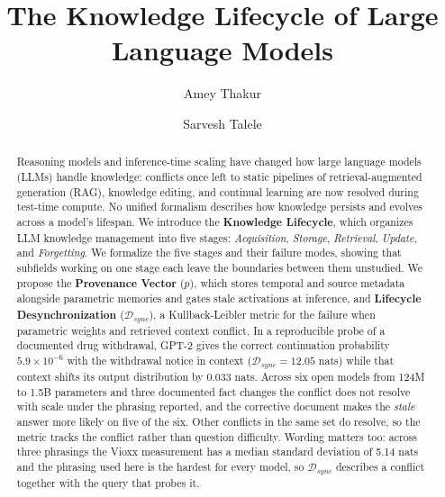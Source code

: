 \documentclass[manuscript, screen, review]{jair}
\title[The Knowledge Lifecycle of LLMs]{The Knowledge Lifecycle of Large Language Models}
\author{Amey Thakur}
\affiliation{%
  \institution{Independent Researcher}
  \city{Toronto}
  \state{Ontario}
  \country{Canada}
}
\author{Sarvesh Talele}
\affiliation{%
  \institution{Independent Researcher}
  \city{Mumbai}
  \state{Maharashtra}
  \country{India}
}
\begin{document}
\begin{abstract}
Reasoning models and inference-time scaling have changed how large language models (LLMs) handle knowledge: conflicts once left to static pipelines of retrieval-augmented generation (RAG), knowledge editing, and continual learning are now resolved during test-time compute. No unified formalism describes how knowledge persists and evolves across a model's lifespan. We introduce the \textbf{Knowledge Lifecycle}, which organizes LLM knowledge management into five stages: \textit{Acquisition}, \textit{Storage}, \textit{Retrieval}, \textit{Update}, and \textit{Forgetting}. We formalize the five stages and their failure modes, showing that subfields working on one stage each leave the boundaries between them unstudied. We propose the \textbf{Provenance Vector} ($p$), which stores temporal and source metadata alongside parametric memories and gates stale activations at inference, and \textbf{Lifecycle Desynchronization} ($\mathcal{D}_{sync}$), a Kullback-Leibler metric for the failure when parametric weights and retrieved context conflict. In a reproducible probe of a documented drug withdrawal, GPT-2 gives the correct continuation probability $5.9 \times 10^{-6}$ with the withdrawal notice in context ($\mathcal{D}_{sync} = 12.05$ nats) while that context shifts its output distribution by $0.033$ nats. Across six open models from 124M to 1.5B parameters and three documented fact changes the conflict does not resolve with scale under the phrasing reported, and the corrective document makes the \textit{stale} answer more likely on five of the six. Other conflicts in the same set do resolve, so the metric tracks the conflict rather than question difficulty. Wording matters too: across three phrasings the Vioxx measurement has a median standard deviation of 5.14 nats and the phrasing used here is the hardest for every model, so $\mathcal{D}_{sync}$ describes a conflict together with the query that probes it.
\end{abstract}

\maketitle
\end{document}
